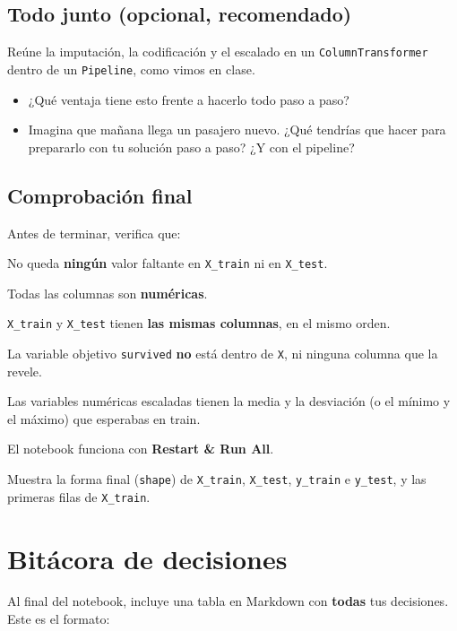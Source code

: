 \documentclass[11pt,a4paper]{article}
\newcommand{\col}[1]{\texttt{#1}}
\begin{document}
\subsection{Todo junto (opcional, recomendado)}

Reúne la imputación, la codificación y el escalado en un \col{ColumnTransformer} dentro de
un \col{Pipeline}, como vimos en clase.
\begin{itemize}
  \item ¿Qué ventaja tiene esto frente a hacerlo todo paso a paso?
  \item Imagina que mañana llega un pasajero nuevo. ¿Qué tendrías que hacer para
        prepararlo con tu solución paso a paso? ¿Y con el pipeline?
\end{itemize}

\subsection{Comprobación final}

Antes de terminar, verifica que:
\begin{checklist}
  \item No queda \textbf{ningún} valor faltante en \col{X\_train} ni en \col{X\_test}.
  \item Todas las columnas son \textbf{numéricas}.
  \item \col{X\_train} y \col{X\_test} tienen \textbf{las mismas columnas}, en el mismo orden.
  \item La variable objetivo \col{survived} \textbf{no} está dentro de \col{X}, ni ninguna
        columna que la revele.
  \item Las variables numéricas escaladas tienen la media y la desviación (o el mínimo y
        el máximo) que esperabas en train.
  \item El notebook funciona con \textbf{Restart \& Run All}.
\end{checklist}

Muestra la forma final (\col{shape}) de \col{X\_train}, \col{X\_test}, \col{y\_train} e
\col{y\_test}, y las primeras filas de \col{X\_train}.

\section*{Bitácora de decisiones}

Al final del notebook, incluye una tabla en Markdown con \textbf{todas} tus decisiones.
Este es el formato:
\end{document}
